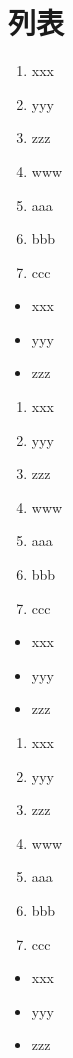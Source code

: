 \section{列表}

\begin{enumerate}
    \item xxx
    \item yyy
    \item zzz
    \item www
    \item aaa
    \item bbb
    \item ccc
\end{enumerate}

\begin{itemize}
	\item xxx
	\item yyy
	\item zzz
\end{itemize}

\begin{enumerate}
    \item xxx
    \item yyy
    \item zzz
    \item www
    \item aaa
    \item bbb
    \item ccc
\end{enumerate}

\begin{itemize}
	\item xxx
	\item yyy
	\item zzz
\end{itemize}

\begin{enumerate}
    \item xxx
    \item yyy
    \item zzz
    \item www
    \item aaa
    \item bbb
    \item ccc
\end{enumerate}

\begin{itemize}
	\item xxx
	\item yyy
	\item zzz
\end{itemize}
